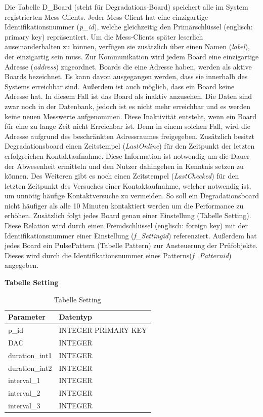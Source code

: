 Die Tabelle D\_Board (steht für Degradations-Board) speichert alle im System registrierten Mess-Clients. Jeder Mess-Client hat eine einzigartige Identifikationsnummer (\textit{p\_id}), welche gleichzeitig den Primärschlüssel (englisch: primary key) repräsentiert. Um die Mess-Clients später leserlich auseinanderhalten zu können, verfügen sie zusätzlich über einen Namen (\textit{label}), der einzigartig sein muss. Zur Kommunikation wird jedem Board eine einzigartige Adresse (\textit{address}) zugeordnet. Boards die eine Adresse haben, werden als aktive Boards bezeichnet. Es kann davon ausgegangen werden, dass sie innerhalb des Systems erreichbar sind. Außerdem ist auch möglich, dass ein Board keine Adresse hat. In diesem Fall ist das Board als inaktiv anzusehen. Die Daten sind zwar noch in der Datenbank, jedoch ist es nicht mehr erreichbar und es werden keine neuen Messwerte aufgenommen. Diese Inaktivität entsteht, wenn ein Board für eine zu lange Zeit nicht Erreichbar ist. Denn in einem solchen Fall, wird die Adresse aufgrund des beschränkten Adressraumes freigegeben. Zusätzlich besitzt Degradationsboard einen Zeitstempel (\textit{LastOnline}) für den Zeitpunkt der letzten erfolgreichen Kontaktaufnahme. Diese Information ist notwendig um die Dauer der Abwesenheit ermitteln und den Nutzer dahingehen in Kenntnis setzen zu können. Des Weiteren gibt es noch einen Zeitstempel (\textit{LastChecked}) für den letzten Zeitpunkt des Versuches einer Kontaktaufnahme, welcher notwendig ist, um unnötig häufige Kontaktversuche zu vermeiden. So soll ein Degradationsboard nicht häufiger als alle 10 Minuten kontaktiert werden um die Performance zu erhöhen. Zusätzlich folgt jedes Board genau einer Einstellung (Tabelle Setting). Diese Relation wird durch einen Fremdschlüssel (englisch: foreign key) mit der Identifikationsnummer einer Einstellung (\textit{f\_Settingid}) referenziert. Außerdem hat jedes Board ein PulsePattern (Tabelle Pattern) zur Ansteuerung der Prüfobjekte. Dieses wird durch die Identifikationsnummer eines Patterns(\textit{f\_Patternid}) angegeben.


\newpage

\textbf{Tabelle Setting}\\

\begin{table}[H]
\begin{center}
\begin{tabular}{|l|l|}\hline
Parameter & Datentyp \\ \hline
p\_id & INTEGER PRIMARY KEY\\ 
DAC & INTEGER\\ 
duration\_int1 & INTEGER\\ 
duration\_int2 & INTEGER\\ 
interval\_1 & INTEGER\\ 
interval\_2 & INTEGER\\ 
interval\_3 & INTEGER\\ \hline
\end{tabular}
\caption{Tabelle Setting}
\label{table_TabelleSetting}
\end{center}
\end{table}

